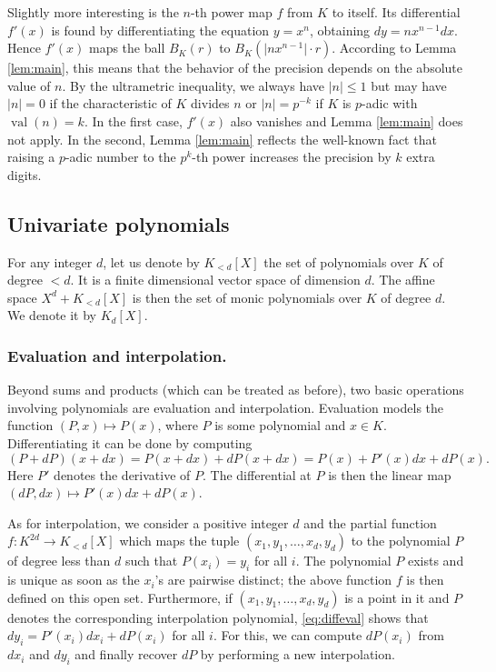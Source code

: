 \documentclass{lms}
\DeclareMathOperator{\val}{val}
\begin{document}
Slightly more interesting is the $n$-th power map $f$ from $K$ to 
itself. Its differential $f'(x)$ is found by differentiating the 
equation $y = x^n$, obtaining $dy = n x^{n-1} dx$.
Hence $f'(x)$ maps the ball $B_K(r)$ to $B_K(\lvert nx^{n-1} \rvert \cdot r)$. According to Lemma \ref{lem:main}, this 
means that the behavior of the precision depends on the absolute value 
of $n$. By the ultrametric inequality, we always have $\lvert n \rvert \leq 1$ but 
may have $\lvert n \rvert = 0$ if the characteristic of $K$ divides $n$ or 
$\lvert n \rvert = p^{-k}$ if $K$ is $p$-adic with $\val(n) = k$.  In the first case,
$f'(x)$ also vanishes and Lemma \ref{lem:main} does 
not apply.  In the second, Lemma \ref{lem:main} reflects the well-known fact that
raising a $p$-adic number to the $p^k$-th power increases the precision 
by $k$ extra digits.

\subsection{Univariate polynomials}
\label{ssec:polynomials}

For any integer $d$, let us denote by $K_{< d}[X]$ the set of 
polynomials over $K$ of degree $< d$. It is a finite dimensional vector 
space of dimension $d$. The affine space $X^d + K_{< d}[X]$ is then 
the set of monic polynomials over $K$ of degree $d$. We denote it by 
$K_d[X]$.

\subsubsection*{Evaluation and interpolation.}

Beyond sums and products (which can be treated as before), two basic 
operations involving polynomials are evaluation and interpolation.
Evaluation models the function $(P,x) \mapsto P(x)$, where
$P$ is some polynomial and $x \in K$. Differentiating
it can be done by computing
\begin{equation}
\label{eq:diffeval}
(P + dP)(x + dx) = P(x + dx) + dP(x + dx) = P(x) + P'(x) dx + dP(x).
\end{equation}
Here $P'$ denotes the derivative of 
$P$. The differential at $P$ is then the linear map $(dP, dx) \mapsto 
P'(x) dx + dP(x)$.

As for interpolation, we consider a positive integer $d$ and the partial 
function $f : K^{2d} \to K_{< d}[X]$ which maps the tuple $(x_1, y_1, 
\ldots, x_d, y_d)$ to the polynomial $P$ of degree less than $d$ such 
that $P(x_i) = y_i$ for all $i$. The polynomial $P$ exists and is unique 
as soon as the $x_i$'s are pairwise distinct; the above function $f$ is 
then defined on this open set. Furthermore, if $(x_1, y_1, \ldots, x_d, 
y_d)$ is a point in it and $P$ denotes the corresponding interpolation 
polynomial, \eqref{eq:diffeval} shows that $d y_i = P'(x_i) dx_i + 
dP(x_i)$ for all $i$. For this, we can compute $dP(x_i)$ from $d x_i$ 
and $d y_i$ and finally recover $dP$ by performing a new interpolation.
\end{document}
